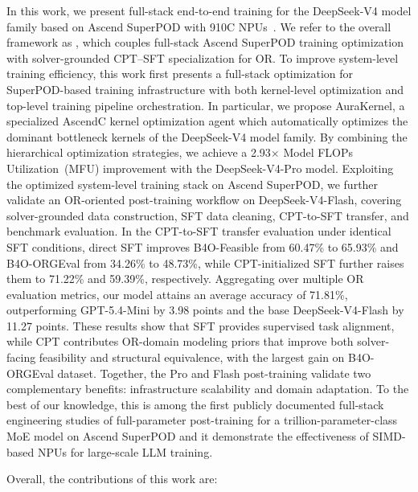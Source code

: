 In this work, we present full-stack end-to-end training for the DeepSeek-V4 model family based on Ascend SuperPOD with 910C NPUs~\citep{zuo2025serving}. 
We refer to the overall framework as \textbf{\modelname}, which couples full-stack Ascend SuperPOD training optimization with solver-grounded CPT--SFT specialization for OR.
To improve system-level training efficiency, this work first presents a full-stack optimization for SuperPOD-based training infrastructure with both kernel-level optimization and top-level training pipeline orchestration. In particular, we propose AuraKernel, a specialized AscendC kernel optimization agent which automatically optimizes the dominant bottleneck kernels of the DeepSeek-V4 model family. 
By combining the hierarchical optimization strategies, we achieve a 2.93$\times$ Model FLOPs Utilization~(MFU) improvement with the DeepSeek-V4-Pro model. 
Exploiting the optimized system-level training stack on Ascend SuperPOD, we further validate an
OR-oriented post-training workflow on DeepSeek-V4-Flash, covering
solver-grounded data construction, SFT data cleaning, CPT-to-SFT transfer, and
benchmark evaluation. In the CPT-to-SFT transfer evaluation under identical SFT
conditions, direct SFT improves B4O-Feasible from 60.47\% to 65.93\% and B4O-ORGEval from 34.26\% to 48.73\%, while CPT-initialized SFT further raises them
to 71.22\% and 59.39\%, respectively. Aggregating over multiple OR evaluation metrics, our model attains an average accuracy of 71.81\%, outperforming GPT-5.4-Mini by 3.98 points and the base DeepSeek-V4-Flash by 11.27 points. These results show that SFT provides
supervised task alignment, while CPT contributes OR-domain modeling priors that
improve both solver-facing feasibility and structural equivalence, with the
largest gain on B4O-ORGEval dataset. Together, the Pro and Flash post-training validate
two complementary benefits: infrastructure
scalability and domain adaptation. To the best of our knowledge, this is among the first publicly documented full-stack engineering studies of full-parameter post-training for a trillion-parameter-class MoE model on Ascend SuperPOD and it demonstrate the effectiveness of SIMD-based NPUs for large-scale LLM training. 

Overall, the contributions of this work are: 

